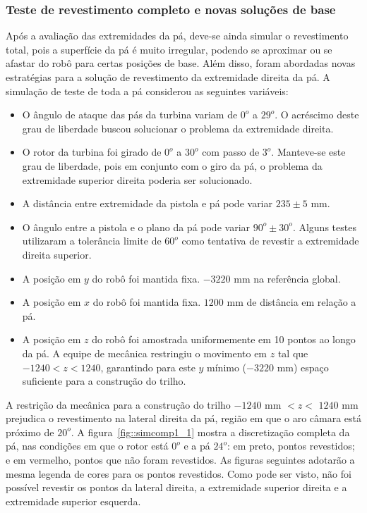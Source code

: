 \subsubsection{Teste de revestimento completo e novas soluções de base}

Após a avaliação das extremidades da pá, deve-se ainda simular o revestimento
total, pois a superfície da pá é muito irregular, podendo se aproximar ou se
afastar do robô para certas posições de base. Além disso, foram abordadas novas
estratégias para a solução de revestimento da extremidade direita da pá. A
simulação de teste de toda a pá considerou as seguintes variáveis:

\begin{itemize}
  \item O ângulo de ataque das pás da turbina variam de $0^o$ a $29^o$. 
  O acréscimo deste
  grau de liberdade buscou solucionar o problema da extremidade direita.
  \item O rotor da turbina foi girado de $0^o$ a $30^o$ com passo de $3^o$.
  Manteve-se este grau de liberdade, pois em conjunto com o giro da pá, o
  problema da extremidade superior direita poderia ser solucionado.
  \item A distância entre extremidade da pistola e pá pode variar $235
  \pm 5$ mm.
  \item O ângulo entre a pistola e o plano da pá pode variar $90^o \pm
  30^o$. Alguns testes utilizaram a tolerância limite de $60^o$ como tentativa
  de revestir a extremidade direita superior.
  \item A posição em $y$ do robô foi mantida fixa. $-3220$ mm na referência
  global.
  \item A posição em $x$ do robô foi mantida fixa. $1200$ mm de
  distância em relação a pá.
  \item A posição em $z$ do robô foi amostrada uniformemente em 10 pontos ao
  longo da pá. A equipe de mecânica restringiu o movimento em $z$ tal que
  $-1240 < z < 1240$, garantindo para este $y$ mínimo ($-3220$ mm) espaço
  suficiente para a construção do trilho.
\end{itemize}

A restrição da mecânica para a construção do trilho $-1240$ mm $< z <$ $1240$ mm
prejudica o revestimento na lateral direita da pá, região em que o aro câmara
está próximo de $20^o$. A figura~\ref{fig::simcomp1_1} mostra a
discretização completa da pá, nas condições em que o rotor está $0^o$ e a pá
$24^o$:
em preto, pontos revestidos; e em vermelho, pontos que não foram revestidos. As
figuras seguintes adotarão a mesma legenda de cores para os pontos revestidos.
Como pode ser visto, não foi possível revestir os pontos da lateral direita, a extremidade superior direita e a extremidade superior esquerda.

